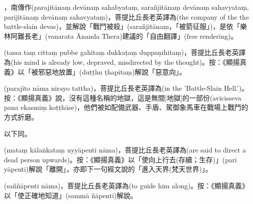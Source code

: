 \startitemgroup[noteitems]
\item{}，南傳作(parajitānaṃ devānaṃ sahabyataṃ, sarañjitānaṃ devānaṃ sahavyataṃ, parijitānaṃ devānaṃ sahavyataṃ)，菩提比丘長老英譯為(the company of the the battle-slain devas)，並解說「戰鬥被殺」(sarañjitānaṃ，「被箭征服」)，是依「樂林阿難長老」(vanarata Ānanda Thera)建議的「自由翻譯」(free rendering)。
\stopitemgroup

\startitemgroup[noteitems]
\item{}(tassa taṃ cittaṃ pubbe gahitaṃ dukkaṭaṃ duppaṇihitaṃ)，菩提比丘長老英譯為(his mind is already low, depraved, misdirected by the thought)。按：《顯揚真義》以「被邪惡地放置」(duṭṭhu ṭhapitaṃ)解說「惡意向」。
\stopitemgroup

\startitemgroup[noteitems]
\item{}(parajito nāma nirayo tattha)，菩提比丘長老英譯為(in the 'Battle-Slain Hell.')。按：《顯揚真義》說，沒有這種名稱的地獄，這是無間[地獄]的一部份(avīcisseva pana ekasmiṃ koṭṭhāse)，他們被如配備武器、手盾、駕御象馬車在戰場上戰鬥的方式折磨。
\stopitemgroup

\startitemgroup[noteitems]
\item{}以下同。
\stopitemgroup

\startitemgroup[noteitems]
\item{}(mataṃ kālaṅkataṃ uyyāpenti nāma)，菩提比丘長老英譯為(are said to direct a dead person upwards)。按：《顯揚真義》以「使向上行去(存續；生存)」(pari yāpenti)解說「離開」，亦即下一句經文說的「進入天界(梵天世界)」。
\stopitemgroup

\startitemgroup[noteitems]
\item{}(saññāpenti nāma)，菩提比丘長老英譯為(to guide him along)。按：《顯揚真義》以「使正確地知道」(sammā ñāpenti)解說。
\stopitemgroup

